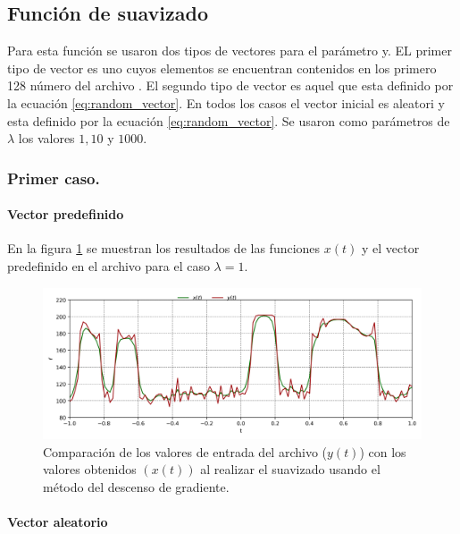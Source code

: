 
\subsection{Función de suavizado}

Para esta función se usaron dos tipos de vectores para el parámetro y. EL primer tipo de vector es uno cuyos elementos se encuentran contenidos en los primero 128 número del archivo . El segundo tipo de vector es aquel que esta definido por la ecuación \ref{eq:random_vector}. En todos los casos el vector inicial es aleatori y esta definido por la ecuación \ref{eq:random_vector}. Se usaron como parámetros de $\lambda$ los valores $1,10$ y $1000$.

\subsubsection{Primer caso.}

\paragraph{Vector predefinido}

En la figura \ref{fig:lambda_1_test} se muestran los resultados de las funciones $x(t)$ y el vector predefinido en el archivo  para el caso $\lambda=1$.

\begin{figure}[H]
    \centering
    \includegraphics[width=17cm]{Graphics/Problema_3/lambda_1_test.png}
    \caption{Comparación de los valores de entrada del archivo  ($y(t)$) con los valores obtenidos $(x(t))$ al realizar el suavizado usando el método del descenso de gradiente.}
    \label{fig:lambda_1_test}
\end{figure}

\paragraph{Vector aleatorio}


